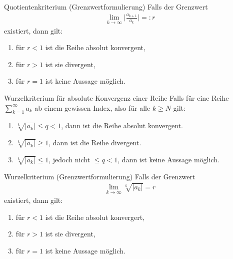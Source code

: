 \begin{karte}{Quotientenkriterium (Grenzwertformulierung)}
	Falls der Grenzwert
	\begin{align}
		\lim_{k\to\infty} \lvert \frac{a_{k+1}}{a_k}\rvert =: r
	\end{align}
	existiert, dann gilt:

	\begin{enumerate}[label=\(\triangleright \)]

		\item für \(r<1\) ist die Reihe absolut konvergent,
		\item für \(r>1\) ist sie divergent,
		\item für \(r=1\) ist keine Aussage möglich.
	\end{enumerate}


\end{karte}

\begin{karte}{Wurzelkriterium für absolute Konvergenz einer Reihe}
	Falls für eine Reihe \(\sum_{k=1}^{\infty}a_k\) ab einem gewissen Index, also für  alle \(k \geq N\) gilt:

	\begin{enumerate}[label=\(\triangleright \)]

		\item \(\sqrt[k]{\lvert a_k\rvert} \leq q < 1\), dann ist die Reihe absolut konvergent.

		\item \(\sqrt[k]{\lvert a_k\rvert} \geq  1\), dann ist die Reihe divergent.

		\item \(\sqrt[k]{\lvert a_k\rvert} \leq  1\), jedoch nicht \(\leq q <1\), dann ist keine  Aussage möglich.
	\end{enumerate}

\end{karte}

\begin{karte}{Wurzelkriterium (Grenzwertformulierung)}
	Falls der Grenzwert
	\begin{align}
		\lim_{k\to\infty} \sqrt[k]{\lvert a_k\rvert} = r
	\end{align}
	existiert, dann gilt:
	\begin{enumerate}[label=\(\triangleright \)]
		\item für \(r < 1\) ist die Reihe absolut konvergert,
		\item für \(r > 1\) ist sie divergent,
		\item für \(r = 1\) ist keine Aussage möglich.
	\end{enumerate}
\end{karte}

